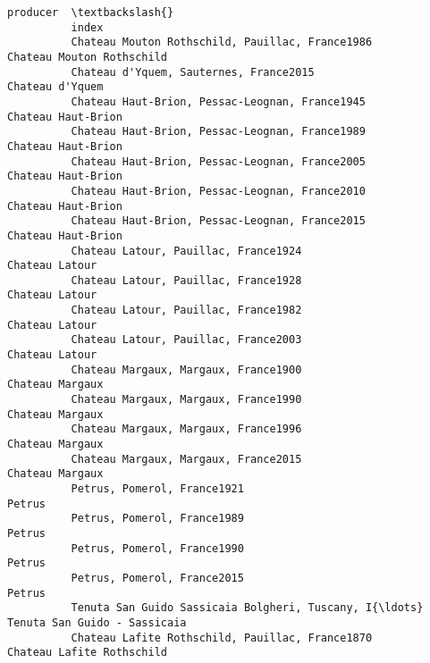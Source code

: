 \documentclass[11pt]{article}
\begin{document}
\begin{Verbatim}[commandchars=\\\{\}]
                                                                                                       producer  \textbackslash{}
          index                                                                                                   
          Chateau Mouton Rothschild, Pauillac, France1986                             Chateau Mouton Rothschild   
          Chateau d'Yquem, Sauternes, France2015                                                Chateau d'Yquem   
          Chateau Haut-Brion, Pessac-Leognan, France1945                                     Chateau Haut-Brion   
          Chateau Haut-Brion, Pessac-Leognan, France1989                                     Chateau Haut-Brion   
          Chateau Haut-Brion, Pessac-Leognan, France2005                                     Chateau Haut-Brion   
          Chateau Haut-Brion, Pessac-Leognan, France2010                                     Chateau Haut-Brion   
          Chateau Haut-Brion, Pessac-Leognan, France2015                                     Chateau Haut-Brion   
          Chateau Latour, Pauillac, France1924                                                   Chateau Latour   
          Chateau Latour, Pauillac, France1928                                                   Chateau Latour   
          Chateau Latour, Pauillac, France1982                                                   Chateau Latour   
          Chateau Latour, Pauillac, France2003                                                   Chateau Latour   
          Chateau Margaux, Margaux, France1900                                                  Chateau Margaux   
          Chateau Margaux, Margaux, France1990                                                  Chateau Margaux   
          Chateau Margaux, Margaux, France1996                                                  Chateau Margaux   
          Chateau Margaux, Margaux, France2015                                                  Chateau Margaux   
          Petrus, Pomerol, France1921                                                                    Petrus   
          Petrus, Pomerol, France1989                                                                    Petrus   
          Petrus, Pomerol, France1990                                                                    Petrus   
          Petrus, Pomerol, France2015                                                                    Petrus   
          Tenuta San Guido Sassicaia Bolgheri, Tuscany, I{\ldots}                       Tenuta San Guido - Sassicaia   
          Chateau Lafite Rothschild, Pauillac, France1870                             Chateau Lafite Rothschild   

\end{Verbatim}
\end{document}
